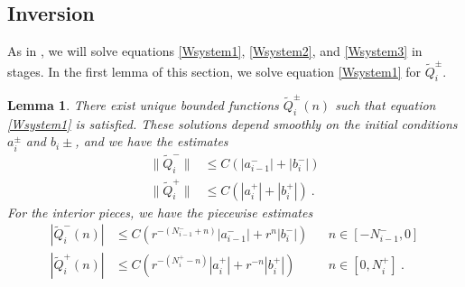 \documentclass[12pt]{elsarticle}
\newtheorem{lemma}{Lemma}
\begin{document}
\subsection{Inversion}

As in \cite{Sandstede1997}, we will solve equations \cref{Wsystem1}, \cref{Wsystem2}, and \cref{Wsystem3} in stages. In the first lemma of this section, we solve equation \cref{Wsystem1} for $\tilde{Q}_i^\pm$. 

\begin{lemma}\label{inv1}
There exist unique bounded functions $\tilde{Q}_i^\pm(n)$ such that equation \cref{Wsystem1} is satisfied. These solutions depend smoothly on the initial conditions $a_i^\pm$ and $b_i\pm$, and we have the estimates
\begin{equation}\label{Wipmest}
\begin{aligned}
\|\tilde{Q}_i^-\| &\leq C (|a_{i-1}^-| + |b_i^-|) \\
\|\tilde{Q}_i^+\| &\leq C (|a_i^+| + |b_i^+| ) \:.
\end{aligned}
\end{equation}
For the interior pieces, we have the piecewise estimates
\begin{equation}\label{Wipiecewise}
\begin{aligned}
|\tilde{Q}_i^-(n)| &\leq C (r^{-(N_{i-1}^- + n)}|a_{i-1}^-| + r^n|b_i^-|) && n \in [-N_{i-1}^-, 0] \\
|\tilde{Q}_i^+(n)| &\leq C (r^{-(N_i^+ - n)}|a_i^+| + r^{-n}|b_i^+| ) && n \in [0, N_i^+] \:.
\end{aligned}
\end{equation}


\end{lemma}
\end{document}
